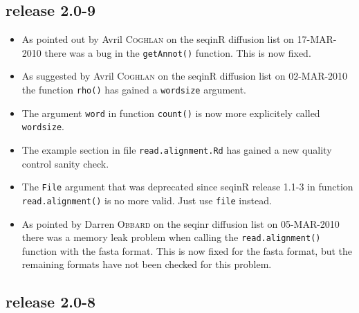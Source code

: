 \documentclass{article}
\begin{document}
\subsection*{release 2.0-9}

\begin{itemize}

\item As pointed out by Avril \textsc{Coghlan} on the seqinR diffusion list on 17-MAR-2010 there was a bug in the \texttt{getAnnot()} function.
This is now fixed.

\item As suggested by Avril \textsc{Coghlan} on the seqinR diffusion list on 02-MAR-2010 the function \texttt{rho()} has gained a \texttt{wordsize}
argument.

\item The argument \texttt{word} in function \texttt{count()} is
now more explicitely called \texttt{wordsize}.

\item The example section in file \texttt{read.alignment.Rd} has gained
a new quality control sanity check.

\item The \texttt{File} argument that was deprecated since seqinR
release 1.1-3 in function \texttt{read.alignment()} is no more valid.
Just use \texttt{file} instead.

\item As pointed by Darren \textsc{Obbard} on the seqinr diffusion list on
05-MAR-2010 there was a memory leak problem when calling the
\texttt{read.alignment()} function with the fasta format. This
is now fixed for the fasta format, but the remaining formats have
not been checked for this problem.

\end{itemize}



\subsection*{release 2.0-8}
\end{document}
